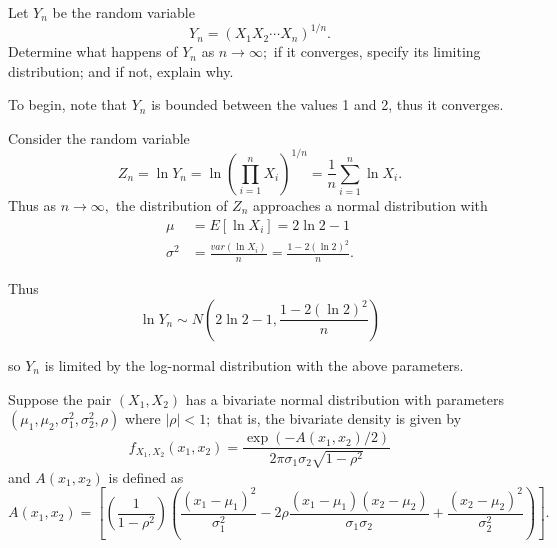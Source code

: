 \documentclass{article}
\begin{document}
\begin{enumerate}
\begin{enumerate}[(a)]
		\ii Let $Y_n$ be the random variable \[Y_n = (X_1X_2\cdots X_n)^{1/n}. \] Determine what happens of $Y_n$ as $n\to\infty;$ if it converges, specify its limiting distribution; and if not, explain why.

		\begin{soln}
			To begin, note that $Y_n$ is bounded between the values 1 and 2, thus it converges.

			Consider the random variable \[Z_n=\ln Y_n=\ln\left( \prod_{i=1}^n X_i \right)^{1/n} = \frac{1}{n}\sum_{i=1}^n \ln X_i. \] Thus as $n\to\infty,$ the distribution of $Z_n$ approaches a normal distribution with 
			\begin{align*}
				\mu &= E[\ln X_i] = 2\ln 2-1 \\
				\sigma^2 &= \frac{var(\ln X_i)}{n} = \frac{1-2(\ln2)^2}{n}.
			\end{align*}

			Thus \[\ln Y_n \sim N\left( 2\ln 2-1, \frac{1-2(\ln2)^2}{n} \right) \]

			so $Y_n$ is limited by the log-normal distribution with the above parameters.
			
		\end{soln}
	\end{enumerate}
	
	\newpage

	\ii Suppose the pair $(X_1, X_2)$ has a bivariate normal distribution with parameters $(\mu_1, \mu_2, \sigma_1^2, \sigma_2^2, \rho)$ where $|\rho|<1;$ that is, the bivariate density is given by \[f_{X_1, X_2}(x_1, x_2) = \frac{\exp{(-A(x_1, x_2)/2)}}{2\pi\sigma_1\sigma_2\sqrt{1-\rho^2}}\] and $A(x_1, x_2)$ is defined as \[A(x_1, x_2) = \left[\left( \frac{1}{1-\rho^2} \right) \left(\frac{(x_1-\mu_1)^2}{\sigma_1^2}-2\rho\frac{(x_1-\mu_1)(x_2-\mu_2)}{\sigma_1\sigma_2}+\frac{(x_2-\mu_2)^2}{\sigma_2^2}\right) \right]. \]
	

\end{enumerate}
\end{document}
